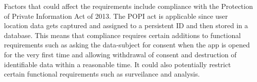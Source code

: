 Factors that could affect the requirements include compliance with the Protection of Private Information Act of 2013. The POPI act is applicable since user location data gets captured and assigned to a persistent ID and then stored in a database. This means that compliance requires certain additions to functional requirements such as asking the data-subject for consent when the app is opened for the very first time and allowing withdrawal of consent and destruction of identifiable data within a reasonable time. It could also potentially restrict certain functional requirements such as surveilance and analysis. 
